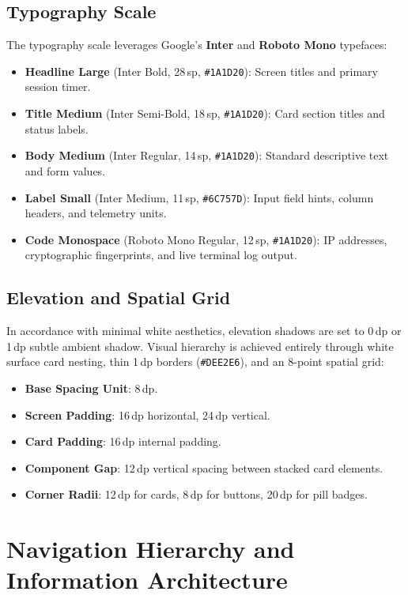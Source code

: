 \subsection{Typography Scale}
The typography scale leverages Google's \textbf{Inter} and \textbf{Roboto Mono} typefaces:
\begin{itemize}
    \item \textbf{Headline Large} (Inter Bold, 28\,sp, \texttt{\#1A1D20}): Screen titles and primary session timer.
    \item \textbf{Title Medium} (Inter Semi-Bold, 18\,sp, \texttt{\#1A1D20}): Card section titles and status labels.
    \item \textbf{Body Medium} (Inter Regular, 14\,sp, \texttt{\#1A1D20}): Standard descriptive text and form values.
    \item \textbf{Label Small} (Inter Medium, 11\,sp, \texttt{\#6C757D}): Input field hints, column headers, and telemetry units.
    \item \textbf{Code Monospace} (Roboto Mono Regular, 12\,sp, \texttt{\#1A1D20}): IP addresses, cryptographic fingerprints, and live terminal log output.
\end{itemize}

\subsection{Elevation and Spatial Grid}
In accordance with minimal white aesthetics, elevation shadows are set to 0\,dp or 1\,dp subtle ambient shadow. Visual hierarchy is achieved entirely through white surface card nesting, thin 1\,dp borders (\texttt{\#DEE2E6}), and an 8-point spatial grid:
\begin{itemize}
    \item \textbf{Base Spacing Unit}: 8\,dp.
    \item \textbf{Screen Padding}: 16\,dp horizontal, 24\,dp vertical.
    \item \textbf{Card Padding}: 16\,dp internal padding.
    \item \textbf{Component Gap}: 12\,dp vertical spacing between stacked card elements.
    \item \textbf{Corner Radii}: 12\,dp for cards, 8\,dp for buttons, 20\,dp for pill badges.
\end{itemize}

\section{Navigation Hierarchy and Information Architecture}
\label{sec:navigation_architecture}

